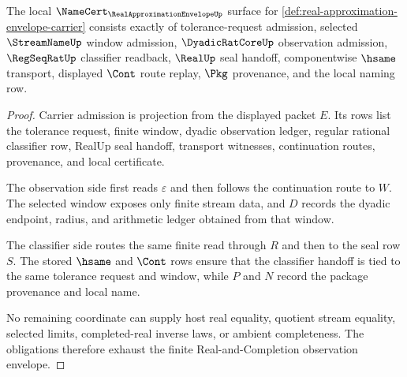 \begin{theorem}
\label{thm:real-approximation-envelope-namecert-obligations}
The local $\NameCert_{\RealApproximationEnvelopeUp}$ surface for \autoref{def:real-approximation-envelope-carrier} consists exactly of tolerance-request admission, selected $\StreamNameUp$ window admission, $\DyadicRatCoreUp$ observation admission, $\RegSeqRatUp$ classifier readback, $\RealUp$ seal handoff, componentwise $\hsame$ transport, displayed $\Cont$ route replay, $\Pkg$ provenance, and the local naming row.
\end{theorem}
\begin{proof}
Carrier admission is projection from the displayed packet $E$. Its rows list the tolerance request, finite window, dyadic observation ledger, regular rational classifier row, RealUp seal handoff, transport witnesses, continuation routes, provenance, and local certificate.

The observation side first reads $\varepsilon$ and then follows the continuation route to $W$. The selected window exposes only finite stream data, and $D$ records the dyadic endpoint, radius, and arithmetic ledger obtained from that window.

The classifier side routes the same finite read through $R$ and then to the seal row $S$. The stored $\hsame$ and $\Cont$ rows ensure that the classifier handoff is tied to the same tolerance request and window, while $P$ and $N$ record the package provenance and local name.

No remaining coordinate can supply host real equality, quotient stream equality, selected limits, completed-real inverse laws, or ambient completeness. The obligations therefore exhaust the finite Real-and-Completion observation envelope.
\end{proof}

